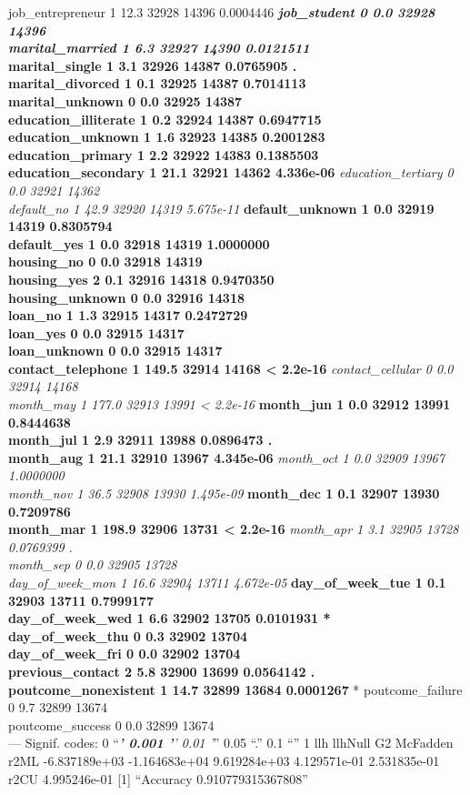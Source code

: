 \documentclass[english,man]{apa6}
\begin{document}
job\_entrepreneur 1 12.3 32928 14396 0.0004446 \textbf{\emph{
job\_student 0 0.0 32928 14396\\
marital\_married 1 6.3 32927 14390 0.0121511 }\\
marital\_single 1 3.1 32926 14387 0.0765905 .\\
marital\_divorced 1 0.1 32925 14387 0.7014113\\
marital\_unknown 0 0.0 32925 14387\\
education\_illiterate 1 0.2 32924 14387 0.6947715\\
education\_unknown 1 1.6 32923 14385 0.2001283\\
education\_primary 1 2.2 32922 14383 0.1385503\\
education\_secondary 1 21.1 32921 14362 4.336e-06 }\emph{
education\_tertiary 0 0.0 32921 14362\\
default\_no 1 42.9 32920 14319 5.675e-11 }\textbf{ default\_unknown 1
0.0 32919 14319 0.8305794\\
default\_yes 1 0.0 32918 14319 1.0000000\\
housing\_no 0 0.0 32918 14319\\
housing\_yes 2 0.1 32916 14318 0.9470350\\
housing\_unknown 0 0.0 32916 14318\\
loan\_no 1 1.3 32915 14317 0.2472729\\
loan\_yes 0 0.0 32915 14317\\
loan\_unknown 0 0.0 32915 14317\\
contact\_telephone 1 149.5 32914 14168 \textless{} 2.2e-16 }\emph{
contact\_cellular 0 0.0 32914 14168\\
month\_may 1 177.0 32913 13991 \textless{} 2.2e-16 }\textbf{ month\_jun
1 0.0 32912 13991 0.8444638\\
month\_jul 1 2.9 32911 13988 0.0896473 .\\
month\_aug 1 21.1 32910 13967 4.345e-06 }\emph{ month\_oct 1 0.0 32909
13967 1.0000000\\
month\_nov 1 36.5 32908 13930 1.495e-09 }\textbf{ month\_dec 1 0.1 32907
13930 0.7209786\\
month\_mar 1 198.9 32906 13731 \textless{} 2.2e-16 }\emph{ month\_apr 1
3.1 32905 13728 0.0769399 .\\
month\_sep 0 0.0 32905 13728\\
day\_of\_week\_mon 1 16.6 32904 13711 4.672e-05 }\textbf{
day\_of\_week\_tue 1 0.1 32903 13711 0.7999177\\
day\_of\_week\_wed 1 6.6 32902 13705 0.0101931 *\\
day\_of\_week\_thu 0 0.3 32902 13704\\
day\_of\_week\_fri 0 0.0 32902 13704\\
previous\_contact 2 5.8 32900 13699 0.0564142 .\\
poutcome\_nonexistent 1 14.7 32899 13684 0.0001267 }* poutcome\_failure
0 9.7 32899 13674\\
poutcome\_success 0 0.0 32899 13674\\
--- Signif. codes: 0 \enquote{\emph{\textbf{' 0.001 '}' 0.01 '}} 0.05
\enquote{.} 0.1 \enquote{} 1 llh llhNull G2 McFadden r2ML -6.837189e+03
-1.164683e+04 9.619284e+03 4.129571e-01 2.531835e-01 r2CU 4.995246e-01
{[}1{]} \enquote{Accuracy 0.910779315367808}
\end{document}
